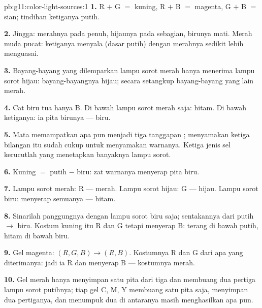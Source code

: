\begin{solution}{pb:g11:color-light-sources:1}
\textbf{1.} R $+$ G $=$ kuning, R $+$ B $=$ magenta, G $+$ B $=$ sian;
tindihan ketiganya putih.

\textbf{2.} Jingga: merahnya pada  penuh, hijaunya pada 
sebagian, birunya mati. Merah muda pucat: ketiganya menyala (dasar
putih) dengan merahnya sedikit lebih menguasai.

\textbf{3.} Bayang-bayang yang dilemparkan lampu sorot merah hanya
menerima lampu sorot hijau: bayang-bayangnya hijau; secara setangkup
bayang-bayang yang lain merah.

\textbf{4.} Cat biru tua hanya  B. Di bawah lampu sorot
merah saja: hitam. Di bawah ketiganya: ia  pita birunya
--- biru.

\textbf{5.} Mata memampatkan  apa pun menjadi tiga tanggapan ; menyamakan ketiga bilangan itu sudah cukup untuk menyamakan
warnanya. Ketiga jenis sel kerucutlah yang menetapkan banyaknya lampu
sorot.

\textbf{6.} Kuning $=$ putih $-$ biru: zat warnanya menyerap pita biru.

\textbf{7.} Lampu sorot merah:  R --- merah. Lampu sorot
hijau:  G --- hijau. Lampu sorot biru: menyerap semuanya
--- hitam.

\textbf{8.} Sinarilah panggungnya dengan lampu sorot biru saja;
sentakannya dari putih $\to$ biru. Kostum kuning itu  R dan
G tetapi menyerap B: terang di bawah putih, hitam di bawah biru.

\textbf{9.} Gel magenta: $(R, G, B) \to (R, B)$. Kostumnya
 R dan G dari apa yang diterimanya: jadi ia 
R dan menyerap B --- kostumnya merah.

\textbf{10.} Gel merah hanya menyimpan satu pita dari tiga dan
membuang dua pertiga  lampu sorot putihnya; tiap gel C, M, Y
membuang satu pita saja, menyimpan dua pertiganya, dan menumpuk dua di
antaranya masih menghasilkan  apa pun.


\end{solution}
